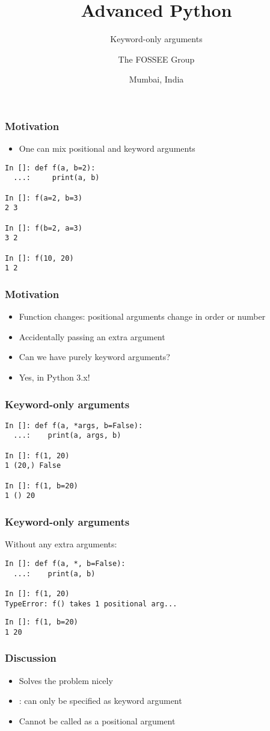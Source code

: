 \documentclass[14pt,compress,aspectratio=169]{beamer}
\title[only kwargs]{Advanced Python}
\subtitle{Keyword-only arguments}
\author[FOSSEE] {The FOSSEE Group}
\institute[IIT Bombay] {Department of Aerospace Engineering\\IIT Bombay}
\date[] {Mumbai, India}
\begin{document}
\begin{frame}
  \titlepage
\end{frame}

\begin{frame}
  \frametitle{Motivation}
  \vspace*{-0.1in}
  \begin{itemize}
  \item One can mix positional and keyword arguments
  \end{itemize}
  \begin{lstlisting}
In []: def f(a, b=2):
  ...:     print(a, b)

In []: f(a=2, b=3)
2 3

In []: f(b=2, a=3)
3 2

In []: f(10, 20)
1 2
\end{lstlisting}
\end{frame}

\begin{frame}[fragile]
  \frametitle{Motivation}
  \begin{itemize}
  \item Function changes: positional arguments change in order or number
  \item Accidentally passing an extra argument
  \item Can we have purely keyword arguments?

    \vspace*{0.5in}
  \item Yes, in Python 3.x!
  \end{itemize}
\end{frame}

\begin{frame}[fragile]
  \frametitle{Keyword-only arguments}
  \begin{lstlisting}
In []: def f(a, *args, b=False):
  ...:    print(a, args, b)

In []: f(1, 20)
1 (20,) False

In []: f(1, b=20)
1 () 20
\end{lstlisting}
\end{frame}

\begin{frame}[fragile]
  \frametitle{Keyword-only arguments}
 \noindent Without any extra arguments:
\vspace*{0.25in}
  \begin{lstlisting}
In []: def f(a, *, b=False):
  ...:    print(a, b)

In []: f(1, 20)
TypeError: f() takes 1 positional arg...
\end{lstlisting}
\pause
  \begin{lstlisting}
In []: f(1, b=20)
1 20
  \end{lstlisting}
\end{frame}

\begin{frame}
  \frametitle{Discussion}
  \begin{itemize}
  \item Solves the problem nicely
  \item {}: can only be specified as keyword argument

  \item Cannot be called as a positional argument
  \end{itemize}
\end{frame}
\end{document}
